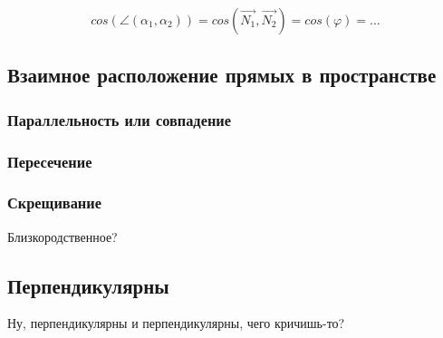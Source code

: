 \documentclass[12pt, a4paper]{article}
\begin{document}
    \begin{equation}
        cos(\angle(\alpha_1, \alpha_2)) = cos(\vec{N_1}, \vec{N_2}) = cos(\varphi) = \dots
    \end{equation}



    \subsection{Взаимное расположение прямых в пространстве}
    
    \subsubsection{Параллельность или совпадение}

    \subsubsection{Пересечение}


    \subsubsection{Скрещивание}
    Близкородственное?


    \subsection{Перпендикулярны}
    Ну, перпендикулярны и перпендикулярны, чего кричишь-то?
\end{document}
